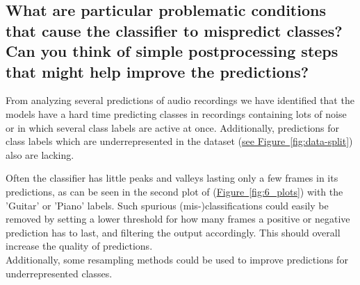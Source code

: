 \subsection{What are particular problematic conditions that cause the classifier to mispredict classes? Can you think of simple postprocessing steps that might help improve the predictions?}
\label{sec:Analysing Predictions:c}

From analyzing several predictions of audio recordings we have identified that the models have a hard time predicting classes in recordings containing lots of noise or in which several class labels are active at once. Additionally, predictions for class labels which are underrepresented in the dataset (\hyperref[fig:data-split]{see Figure~\ref*{fig:data-split}}) also are lacking. 

Often the classifier has little peaks and valleys lasting only a few frames in its predictions, as can be seen in the second plot of (\hyperref[fig:6_plots]{Figure~\ref*{fig:6_plots}}) with the 'Guitar' or 'Piano' labels. Such spurious (mis-)classifications could easily be removed by setting a lower threshold for how many frames a positive or negative prediction has to last, and filtering the output accordingly. This should overall increase the quality of predictions.\\
Additionally, some resampling methods could be used to improve predictions for underrepresented classes.





